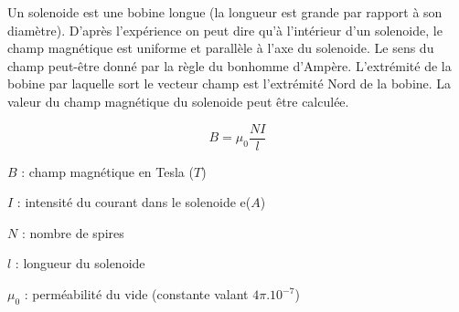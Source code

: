 
Un solenoide est une bobine longue (la longueur est grande par rapport \`a son diam\`etre). D'apr\`es l'exp\'erience on peut dire qu'\`a l'int\'erieur d'un solenoide, le champ magn\'etique est uniforme et parall\`ele \`a l'axe du solenoide. Le sens du champ peut-\^etre donn\'e par la r\`egle du bonhomme d'Amp\`ere. L'extr\'emit\'e de la bobine par laquelle sort le vecteur champ est l'extr\'emit\'e Nord de la bobine.
La valeur du champ magn\'etique du solenoide peut \^etre calcul\'ee.

\[B = \mu_0 \frac{N I}{l}\]

\begin{unites}
\item $B$ : champ magn\'etique en Tesla ($T$)
\item $I$ : intensit\'e du courant dans le solenoide e($A$)
\item $N$ : nombre de spires
\item $l$ : longueur du solenoide
\item $\mu_0$ : perm\'eabilit\'e du vide (constante valant $4 \pi . 10^{-7}$)
\end{unites}
